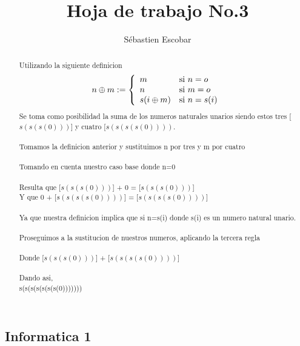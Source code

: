 \documentclass[12pt,letterpaper,twocolumn]{article}
\begin{document}
\title{Hoja de trabajo No.3}
\author{Sébastien Escobar}
\maketitle

\subsection*{Informatica 1}
\renewcommand{\abstractname}{Ejercicio No.1 }
\begin{abstract}
Utilizando la siguiente definicion 
\[
        n\oplus m := \left\{
        \begin{array}{l l}
            m & \mbox{si } n=o \\
            n & \mbox{si } m=o \\
            s(i\oplus m) & \mbox{si } n=s(i) \\
        \end{array}
        \right.
    \]
Se toma como posibilidad la suma de los numeros naturales unarios siendo estos  tres [$s(s(s(0)))$] y cuatro [$s(s(s(s(0))))$.
\\
\\Tomamos la definicion anterior y sustituimos n por tres y m por cuatro
\\
\\Tomando en cuenta nuestro caso base donde n=0
\\
\\Resulta que  [$s(s(s(0)))$] + 0 =  [$s(s(s(0)))$]
\\Y que 0 +  [$s(s(s(s(0))))$] =  [$s(s(s(s(0))))$]
\\
\\ Ya que nuestra definicion implica que si n=s(i) donde s(i) es un numero natural unario.
\\
\\ Proseguimos a la sustitucion de nuestros numeros, aplicando la tercera regla
\\
\\Donde  [$s(s(s(0)))$] +  [$s(s(s(s(0))))$]
\\
\\Dando asi,
\\s(s(s(s(s(s(s(0)))))))

\end{abstract}
\end{document}
